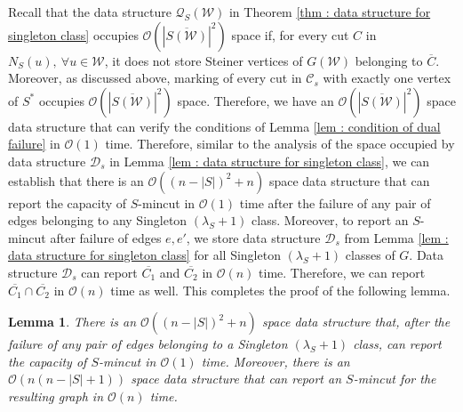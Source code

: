 \documentclass[letterpaper,11pt]{article}
\newtheorem{lemma}{Lemma}[]
\begin{document}
Recall that the data structure ${\mathcal Q}_S({\mathcal W})$ in Theorem \ref{thm : data structure for singleton class} occupies ${\mathcal O}(|\overline{S({\mathcal W})}|^2)$ space if, for every cut $C$ in $N_S(u),~\forall u\in {\mathcal W}$, it does not store Steiner vertices of $G({\mathcal W})$ belonging to $\overline{C}$. Moreover, as discussed above, marking of every cut in ${\mathcal C}_s$ with exactly one vertex of $S^*$ occupies ${\mathcal O}(|\overline{S({\mathcal W})}|^2)$ space. Therefore, we have an ${\mathcal O}(|\overline{S({\mathcal W})}|^2)$ space data structure that can verify the conditions of Lemma \ref{lem : condition of dual failure} in ${\mathcal O}(1)$ time. Therefore, similar to the analysis of the space occupied by data structure ${\mathcal D}_s$ in Lemma \ref{lem : data structure for singleton class}, we can establish that there is an ${\mathcal O}((n-|S|)^2+n)$ space data structure that can report the capacity of $S$-mincut in ${\mathcal O}(1)$ time after the failure of any pair of edges belonging to any Singleton $(\lambda_S+1)$ class.
Moreover, to report an $S$-mincut after failure of edges $e,e'$, we store data structure ${\mathcal D}_s$ from Lemma \ref{lem : data structure for singleton class} for all Singleton $(\lambda_S+1)$ classes of $G$. Data structure ${\mathcal D}_s$ can report $\overline{C_1}$ and $\overline{C_2}$ in ${\mathcal O}(n)$ time. Therefore, we can report $\overline{C_1}\cap \overline{C_2}$ in ${\mathcal O}(n)$ time as well. This completes the proof of the following lemma.



















    
    






\begin{lemma} \label{lem : singleton class final lemma}
    There is an ${\mathcal O}((n-|S|)^2+n)$ space data structure that, after the failure of any pair of edges belonging to a Singleton $(\lambda_S+1)$ class, can report the capacity of $S$-mincut in ${\mathcal O}(1)$ time. Moreover, there is an ${\mathcal O}(n(n-|S|+1))$ space data structure that can report an $S$-mincut for the resulting graph in ${\mathcal O}(n)$ time.
\end{lemma}
\end{document}
